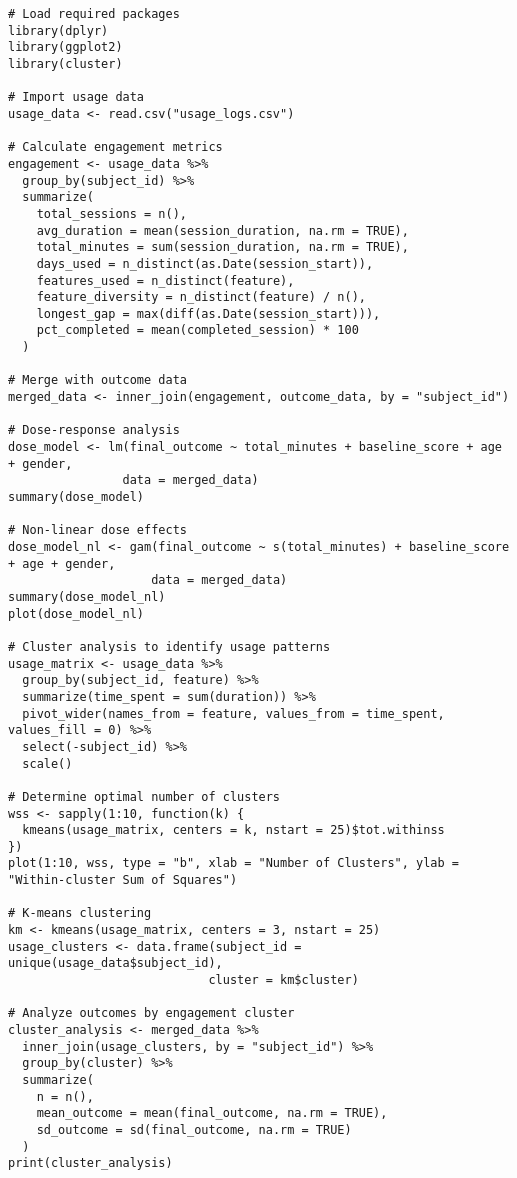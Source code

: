 \begin{tcolorbox}[title=R Code for Engagement Analysis]
\begin{verbatim}
# Load required packages
library(dplyr)
library(ggplot2)
library(cluster)

# Import usage data
usage_data <- read.csv("usage_logs.csv")

# Calculate engagement metrics
engagement <- usage_data %>%
  group_by(subject_id) %>%
  summarize(
    total_sessions = n(),
    avg_duration = mean(session_duration, na.rm = TRUE),
    total_minutes = sum(session_duration, na.rm = TRUE),
    days_used = n_distinct(as.Date(session_start)),
    features_used = n_distinct(feature),
    feature_diversity = n_distinct(feature) / n(),
    longest_gap = max(diff(as.Date(session_start))),
    pct_completed = mean(completed_session) * 100
  )

# Merge with outcome data
merged_data <- inner_join(engagement, outcome_data, by = "subject_id")

# Dose-response analysis
dose_model <- lm(final_outcome ~ total_minutes + baseline_score + age + gender,
                data = merged_data)
summary(dose_model)

# Non-linear dose effects
dose_model_nl <- gam(final_outcome ~ s(total_minutes) + baseline_score + age + gender,
                    data = merged_data)
summary(dose_model_nl)
plot(dose_model_nl)

# Cluster analysis to identify usage patterns
usage_matrix <- usage_data %>%
  group_by(subject_id, feature) %>%
  summarize(time_spent = sum(duration)) %>%
  pivot_wider(names_from = feature, values_from = time_spent, values_fill = 0) %>%
  select(-subject_id) %>%
  scale()

# Determine optimal number of clusters
wss <- sapply(1:10, function(k) {
  kmeans(usage_matrix, centers = k, nstart = 25)$tot.withinss
})
plot(1:10, wss, type = "b", xlab = "Number of Clusters", ylab = "Within-cluster Sum of Squares")

# K-means clustering
km <- kmeans(usage_matrix, centers = 3, nstart = 25)
usage_clusters <- data.frame(subject_id = unique(usage_data$subject_id),
                            cluster = km$cluster)

# Analyze outcomes by engagement cluster
cluster_analysis <- merged_data %>%
  inner_join(usage_clusters, by = "subject_id") %>%
  group_by(cluster) %>%
  summarize(
    n = n(),
    mean_outcome = mean(final_outcome, na.rm = TRUE),
    sd_outcome = sd(final_outcome, na.rm = TRUE)
  )
print(cluster_analysis)
\end{verbatim}
\end{tcolorbox}

